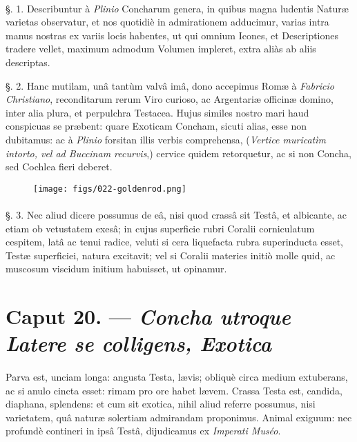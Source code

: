 \documentclass[a4paper, 11pt, oneside, polutonikogreek, german]{article}
\begin{document}
\paragraph{}
§. 1. Describuntur à \emph{Plinio} Concharum genera, in quibus magna ludentis Naturæ varietas observatur, et nos quotidiè in admirationem adducimur, varias intra manus nostras ex variis locis habentes, ut qui omnium Icones, et Descriptiones tradere vellet, maximum admodum Volumen impleret, extra aliàs ab aliis descriptas.

§. 2. Hanc mutilam, unâ tantùm valvâ imâ, dono accepimus Romæ à \emph{Fabricio Christiano}, reconditarum rerum Viro curioso, ac Argentariæ officinæ domino, inter alia plura, et perpulchra Testacea. Hujus similes nostro mari haud conspicuas se præbent: quare Exoticam Concham, sicuti alias, esse non dubitamus: ac à \emph{Plinio} forsitan illis verbis comprehensa, (\emph{Vertice muricatìm intorto, vel ad Buccinam recurvis},) cervice quidem retorquetur, ac si non Concha, sed Cochlea fieri deberet.

\begin{figure}[H]
\centering
\texttt{[image: figs/022-goldenrod.png]}

\end{figure}
\paragraph{}
§. 3. Nec aliud dicere possumus de eâ, nisi quod crassâ sit Testâ, et albicante, ac etiam ob vetustatem exesâ; in cujus superficie rubri Coralii corniculatum cespitem, latâ ac tenui radice, veluti si cera liquefacta rubra superinducta esset, Testæ superficiei, natura excitavit; vel si Coralii materies initiò molle quid, ac muscosum viscidum initium habuisset, ut opinamur.

\section{Caput 20. --- \emph{Concha utroque Latere se colligens, Exotica}}
\paragraph{}
Parva est, unciam longa: angusta Testa, lævis; obliquè circa medium extuberans, ac si anulo cincta esset: rimam pro ore habet lævem. Crassa Testa est, candida, diaphana, splendens: et cum sit exotica, nihil aliud referre possumus, nisi varietatem, quâ naturæ solertiam admirandam proponimus. Animal exiguum: nec profundè contineri in ipsâ Testâ, dijudicamus ex \emph{Imperati Muséo}.
\end{document}
